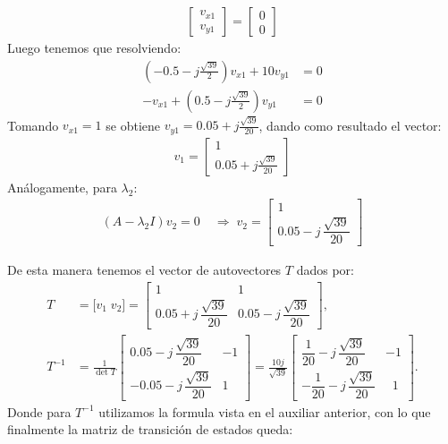 \documentclass[
  11pt,
  letterpaper,
   addpoints,
   answers
  ]{exam}
\begin{document}
\begin{solution}
\begin{align}
  \begin{bmatrix}
    v_{x1} \\ v_{y1}
  \end{bmatrix}
  = \begin{bmatrix}
    0 \\ 0
  \end{bmatrix}
\end{align}
Luego tenemos que resolviendo:
\begin{align}
  \left(-0.5 - j\frac{\sqrt{39}}{2}\right)v_{x1} + 10 v_{y1} &= 0 \\
  -v_{x1} + \left(0.5 - j\frac{\sqrt{39}}{2}\right)v_{y1} &= 0
\end{align}
Tomando $v_{x1}=1$ se obtiene $v_{y1} = 0.05 + j\tfrac{\sqrt{39}}{20}$, dando como resultado el vector:
\begin{align}
  v_1 = \begin{bmatrix} 1 \\ 0.05 + j\tfrac{\sqrt{39}}{20} \end{bmatrix}
\end{align}
Análogamente, para $\lambda_2$:
\begin{align}
(A-\lambda_2 I)v_2=0
&\;\Rightarrow\;
v_2=
\begin{bmatrix}
1\\[2pt]
0.05-j\,\dfrac{\sqrt{39}}{20}
\end{bmatrix}
\end{align}

De esta manera tenemos el vector de autovectores $T$ dados por:
\begin{align}
T&=\big[v_1\; v_2\big]=
\begin{bmatrix}
1 & 1\\[2pt]
0.05+j\,\dfrac{\sqrt{39}}{20} &
0.05-j\,\dfrac{\sqrt{39}}{20}
\end{bmatrix},\\[6pt]
T^{-1}&=\frac{1}{\det T}
\begin{bmatrix}
0.05-j\,\dfrac{\sqrt{39}}{20} & -1\\[6pt]
-0.05-j\,\dfrac{\sqrt{39}}{20} & 1
\end{bmatrix}
=\frac{10j}{\sqrt{39}}
\begin{bmatrix}
\dfrac{1}{20}-j\,\dfrac{\sqrt{39}}{20} & -1\\[8pt]
-\dfrac{1}{20}-j\,\dfrac{\sqrt{39}}{20} & \;\;1
\end{bmatrix}.
\end{align}
Donde para $T^{-1}$ utilizamos la formula vista en el auxiliar anterior, con lo que finalmente la matriz de transición de estados queda:


\end{solution}
\end{document}
